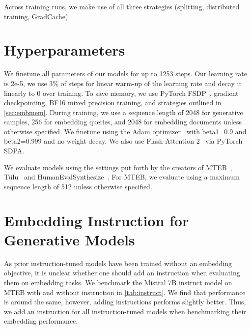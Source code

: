 \documentclass{article}
\newcommand{\tulu}{T\"ulu}
\begin{document}
Across training runs, we make use of all three strategies (splitting, distributed training, GradCache).

\FloatBarrier

\section{Hyperparameters}
\label{sec:hps}

We finetune all parameters of our models for up to 1253 steps. Our learning rate is 2e-5, we use 3\% of steps for linear warm-up of the learning rate and decay it linearly to 0 over training. To save memory, we use PyTorch FSDP~\cite{zhao2023pytorch}, gradient checkpointing, BF16 mixed precision training, and strategies outlined in \autoref{sec:embmem}. During training, we use a sequence length of 2048 for generative samples, 256 for embedding queries, and 2048 for embedding documents unless otherwise specified. We finetune using the Adam optimizer~\cite{kingma2017adam} with beta1=0.9 and beta2=0.999 and no weight decay. We also use Flash-Attention 2~\cite{dao2022flashattention,dao2023flashattention} via PyTorch SDPA.

We evaluate models using the settings put forth by the creators of MTEB~\cite{muennighoff2023mteb}, \tulu~\cite{ivison2023camels,wang2024improving} and HumanEvalSynthesize~\cite{muennighoff2023octopack,zhuo2024astraios}. For MTEB, we evaluate using a maximum sequence length of 512 unless otherwise specified.

\FloatBarrier

\section{Embedding Instruction for Generative Models}

As prior instruction-tuned models have been trained without an embedding objective, it is unclear whether one should add an instruction when evaluating them on embedding tasks. We benchmark the Mistral 7B instruct model on MTEB with and without instruction in \autoref{tab:instruct}. We find that performance is around the same, however, adding instructions performs slightly better. Thus, we add an instruction for all instruction-tuned models when benchmarking their embedding performance.
\end{document}
